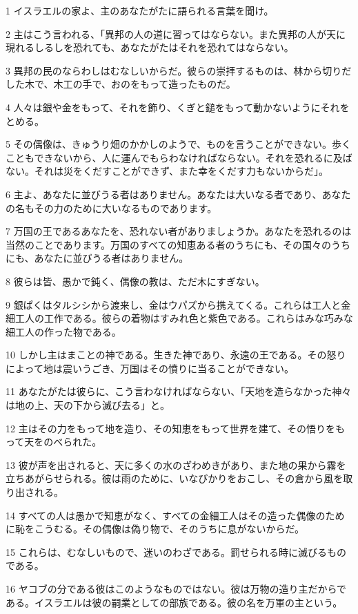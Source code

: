 \par 1 イスラエルの家よ、主のあなたがたに語られる言葉を聞け。
\par 2 主はこう言われる、「異邦の人の道に習ってはならない。また異邦の人が天に現れるしるしを恐れても、あなたがたはそれを恐れてはならない。
\par 3 異邦の民のならわしはむなしいからだ。彼らの崇拝するものは、林から切りだした木で、木工の手で、おのをもって造ったものだ。
\par 4 人々は銀や金をもって、それを飾り、くぎと鎚をもって動かないようにそれをとめる。
\par 5 その偶像は、きゅうり畑のかかしのようで、ものを言うことができない。歩くこともできないから、人に運んでもらわなければならない。それを恐れるに及ばない。それは災をくだすことができず、また幸をくだす力もないからだ」。
\par 6 主よ、あなたに並びうる者はありません。あなたは大いなる者であり、あなたの名もその力のために大いなるものであります。
\par 7 万国の王であるあなたを、恐れない者がありましょうか。あなたを恐れるのは当然のことであります。万国のすべての知恵ある者のうちにも、その国々のうちにも、あなたに並びうる者はありません。
\par 8 彼らは皆、愚かで鈍く、偶像の教は、ただ木にすぎない。
\par 9 銀ぱくはタルシシから渡来し、金はウパズから携えてくる。これらは工人と金細工人の工作である。彼らの着物はすみれ色と紫色である。これらはみな巧みな細工人の作った物である。
\par 10 しかし主はまことの神である。生きた神であり、永遠の王である。その怒りによって地は震いうごき、万国はその憤りに当ることができない。
\par 11 あなたがたは彼らに、こう言わなければならない、「天地を造らなかった神々は地の上、天の下から滅び去る」と。
\par 12 主はその力をもって地を造り、その知恵をもって世界を建て、その悟りをもって天をのべられた。
\par 13 彼が声を出されると、天に多くの水のざわめきがあり、また地の果から霧を立ちあがらせられる。彼は雨のために、いなびかりをおこし、その倉から風を取り出される。
\par 14 すべての人は愚かで知恵がなく、すべての金細工人はその造った偶像のために恥をこうむる。その偶像は偽り物で、そのうちに息がないからだ。
\par 15 これらは、むなしいもので、迷いのわざである。罰せられる時に滅びるものである。
\par 16 ヤコブの分である彼はこのようなものではない。彼は万物の造り主だからである。イスラエルは彼の嗣業としての部族である。彼の名を万軍の主という。
